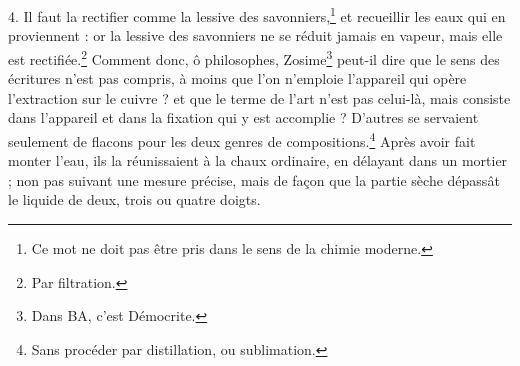 \documentclass[landscape, a4paper, 11pt, oneside, polutonikogreek, french]{article}
\begin{document}
4. Il faut la rectifier comme la lessive des savonniers,\footnote{Ce mot ne doit pas être pris dans le sens de la chimie moderne.} et recueillir les eaux qui en proviennent : or la lessive des savonniers ne se réduit jamais en vapeur, mais elle est rectifiée.\footnote{Par filtration.} Comment donc, ô philosophes, Zosime\footnote{Dans BA, c'est Démocrite.} peut-il dire que le sens des écritures n'est pas compris, à moins que l'on n'emploie l'appareil qui opère l'extraction sur le cuivre ? et que le terme de l'art n'est pas celui-là, mais consiste dans l'appareil et dans la fixation qui y est accomplie ? D'autres se servaient seulement de flacons pour les deux genres de compositions.\footnote{Sans procéder par distillation, ou sublimation.} Après avoir fait monter l'eau, ils la réunissaient à la chaux ordinaire, en délayant dans un mortier ; non pas suivant une mesure précise, mais de façon que la partie sèche dépassât le liquide de deux, trois ou quatre doigts.

\bigskip
\centerline{\EightStarTaper}
\centerline{\EightStarTaper\EightStarTaper}
\bigskip
\end{document}
